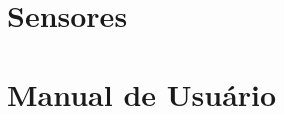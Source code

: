 \documentclass[10pt,a4paper]{article}
\begin{document}
\section{Sensores}

\section{Manual de Usuário}

\end{document}
